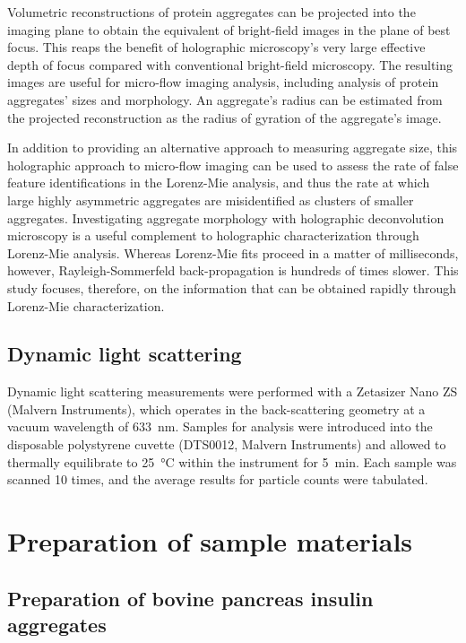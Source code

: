 Volumetric reconstructions of protein aggregates can be projected
into the imaging plane to obtain the equivalent of bright-field images
in the plane of best focus.  This reaps the benefit of holographic
microscopy's very large effective depth of focus compared with
conventional bright-field microscopy.  The resulting images are
useful for micro-flow imaging analysis, including analysis of
protein aggregates' sizes and morphology. An aggregate’s radius can be estimated from the projected reconstruction as the radius of gyration of the aggregate’s image.

In addition to providing an alternative approach to measuring aggregate size, this holographic approach to micro-flow imaging can be used to assess the rate of
false feature identifications in the Lorenz-Mie analysis, and thus
the rate at which large highly asymmetric aggregates are misidentified as clusters
of smaller aggregates.
Investigating aggregate morphology with holographic deconvolution
microscopy is a useful complement to holographic characterization through
Lorenz-Mie analysis. Whereas Lorenz-Mie fits proceed in a matter of milliseconds,
however, Rayleigh-Sommerfeld back-propagation is 
hundreds of times slower.  This study focuses, therefore,
on the information that can be obtained rapidly through
Lorenz-Mie characterization.  

\subsection{Dynamic light scattering}

Dynamic light scattering measurements were performed with a
Zetasizer Nano ZS (Malvern Instruments), which operates
in the back-scattering geometry at a vacuum wavelength
of \SI{633}{\nm}.
Samples for analysis were introduced into the disposable polystyrene
cuvette (DTS0012, Malvern Instruments) and allowed to thermally equilibrate
to \SI{25}{\celsius} within the instrument for \SI{5}{\minute}.
Each sample was scanned \num{10} times, and the average
results for particle counts were tabulated.

\section{Preparation of sample materials}
\label{sec:proteinpreparation}

\subsection{Preparation of bovine pancreas insulin aggregates}
\label{sec:biprep}


